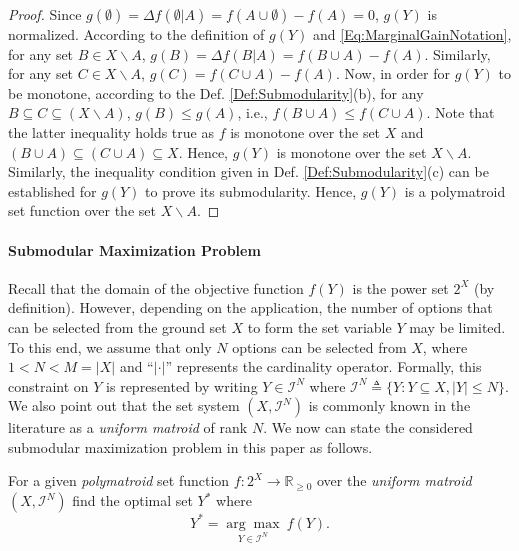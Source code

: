 \documentclass[conference]{IEEEtran}
\newcommand{\R}{\mathbb{R}}
\begin{document}
\begin{proof}
Since $g(\emptyset)=\Delta f(\emptyset \vert A) = f(A\cup\emptyset)-f(A)=0$, $g(Y)$ is normalized. 
According to the definition of $g(Y)$ and \eqref{Eq:MarginalGainNotation}, for any set $B\in X \backslash A$, $g(B) = \Delta f(B\vert A) = f(B \cup A)-f(A)$. Similarly, for any set $C\in X\backslash A$, $g(C)=f(C\cup A)-f(A)$. 
Now, in order for $g(Y)$ to be monotone, according to the Def. \ref{Def:Submodularity}(b), for any $B\subseteq C\subseteq (X\backslash A)$,  $g(B)\leq g(A)$, i.e., $f(B\cup A) \leq f(C\cup A)$. Note that the latter inequality holds true as $f$ is monotone over the set $X$ and $(B\cup A) \subseteq (C\cup A) \subseteq X$. Hence, $g(Y)$ is monotone over the set $X \backslash A$. Similarly, the inequality condition given in Def. \ref{Def:Submodularity}(c) can be established for $g(Y)$ to prove its submodularity. Hence, $g(Y)$ is a polymatroid set function over the set $X \backslash A$. 
\end{proof}


\paragraph*{\textbf{Submodular Maximization Problem}}

Recall that the domain of the objective function $f(Y)$ is the power set $2^X$ (by definition). However, depending on the application, the number of options that can be selected from the ground set $X$ to form the set variable $Y$ may be limited. To this end, we assume that only $N$ options can be selected from $X$, where $1<N<M=\vert X \vert$ and ``$\vert \cdot \vert$'' represents the cardinality operator. Formally, this constraint on $Y$ is represented by writing $Y\in\mathcal{I}^N$ where $\mathcal{I}^N\triangleq \{Y:Y \subseteq X, \vert Y \vert \leq N\}$. We also point out that the set system $(X,\mathcal{I}^N)$ is commonly known in the literature \cite{Liu2018} as a \emph{uniform matroid} of rank $N$. We now can state the considered submodular maximization problem in this paper as follows. 

For a given \emph{polymatroid} set function $f:2^X\rightarrow \R_{\geq 0}$ over the \emph{uniform matroid} $(X,\mathcal{I}^N)$ find the optimal set $Y^*$ where  
\begin{equation}\label{Eq:SubmodularMaximizationProblem}
    Y^* = \underset{Y\in\mathcal{I}^N}{\arg\max} \ f(Y).
\end{equation}
\end{document}
